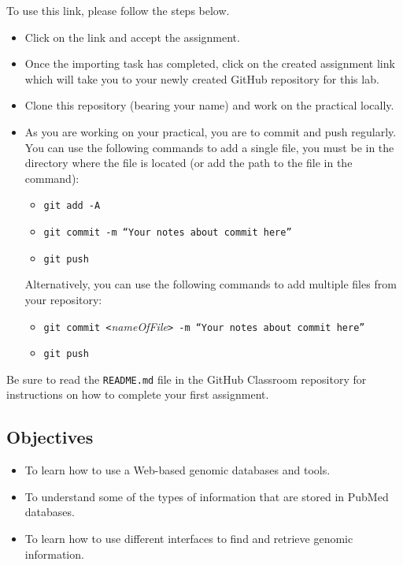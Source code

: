 To use this link, please follow the steps below.
\begin{itemize}
	\item Click on the link and accept the assignment.
	\item Once the importing task has completed, click on the created assignment link which will take you to your newly created GitHub repository for this lab.
	\item Clone this repository (bearing your name) and work on the practical locally.
	\item As you are working on your practical, you are to commit and push regularly. You can use the following commands to add a single file, you must be in the directory where the file is located (or add the path to the file in the command):
		\begin{itemize}
		\item {\tt git add -A}
		\item {\tt git commit -m ``Your notes about commit here''}
		\item {\tt git push}
	\end{itemize}

	Alternatively, you can use the following commands to add multiple files from your repository:
	\begin{itemize}
		\item {\tt git commit <}\emph{nameOfFile}\tt{> -m ``Your notes about commit here''}
		\item {\tt git push}
	\end{itemize}
\end{itemize}

Be sure to read the {\tt README.md} file in the GitHub Classroom repository for instructions on how to complete your first assignment.




\subsection*{Objectives}
\begin{itemize}
	\item To learn how to use a Web-based genomic databases and tools.
	\item To understand some of the types of information that are stored in PubMed databases.
	\item To learn how to use different interfaces to find and retrieve genomic information. 
\end{itemize}

